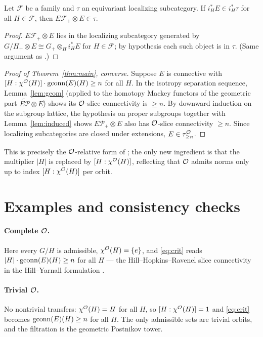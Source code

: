 \documentclass[11pt]{article}
\begin{document}
\begin{qfivelemma}\label{lem:induced}
Let $\mathcal F$ be a family and $\tau$ an equivariant localizing subcategory. If
$i_H^\ast E\in i_H^\ast\tau$ for all $H\in\mathcal F$, then $E\mathcal
F_+\otimes E\in\tau$.
\end{qfivelemma}

\begin{proof}
$E\mathcal F_+\otimes E$ lies in the localizing subcategory generated by
$G/H_+\otimes E\cong G_+\otimes_H i_H^\ast E$ for $H\in\mathcal F$; by hypothesis
each such object is in $\tau$. (Same argument as \cite[Lem.~2.4]{HY18}.)
\end{proof}

\begin{proof}[Proof of Theorem~\ref{thm:main}, converse]
Suppose $E$ is connective with $[H:\chi^{\mathcal{O}}(H)]\cdot\operatorname{gconn}(E)(H)\ge n$ for all
$H$. In the isotropy separation sequence, Lemma~\ref{lem:geom} (applied to the
homotopy Mackey functors of the geometric part $\widetilde{E\mathcal P}\otimes
E$) shows its $\mathcal{O}$-slice connectivity is $\ge n$. By downward induction on the
subgroup lattice, the hypothesis on proper subgroups together with
Lemma~\ref{lem:induced} shows $E\mathcal P_+\otimes E$ also has $\mathcal{O}$-slice
connectivity $\ge n$. Since localizing subcategories are closed under
extensions, $E\in\tau^{\mathcal{O}}_{\ge n}$.
\end{proof}

This is precisely the $\mathcal{O}$-relative form of \cite[Thm.~2.5]{HY18}; the only
new ingredient is that the multiplier $|H|$ is replaced by $[H:\chi^{\mathcal{O}}(H)]$,
reflecting that $\mathcal{O}$ admits norms only up to index $[H:\chi^{\mathcal{O}}(H)]$ per orbit.

\section*{Examples and consistency checks}

\paragraph{Complete $\mathcal{O}$.} Here every $G/H$ is admissible, $\chi^{\mathcal{O}}(H)=\{e\}$,
and \eqref{eq:crit} reads $|H|\cdot\operatorname{gconn}(E)(H)\ge n$ for all $H$ --- the
Hill--Hopkins--Ravenel slice connectivity in the Hill--Yarnall formulation
\cite{HY18, HHR16}.

\paragraph{Trivial $\mathcal{O}$.} No nontrivial transfers: $\chi^{\mathcal{O}}(H)=H$ for all $H$,
so $[H:\chi^{\mathcal{O}}(H)]=1$ and \eqref{eq:crit} becomes $\operatorname{gconn}(E)(H)\ge n$ for all
$H$. The only admissible sets are trivial orbits, and the filtration is the
geometric Postnikov tower.
\end{document}
